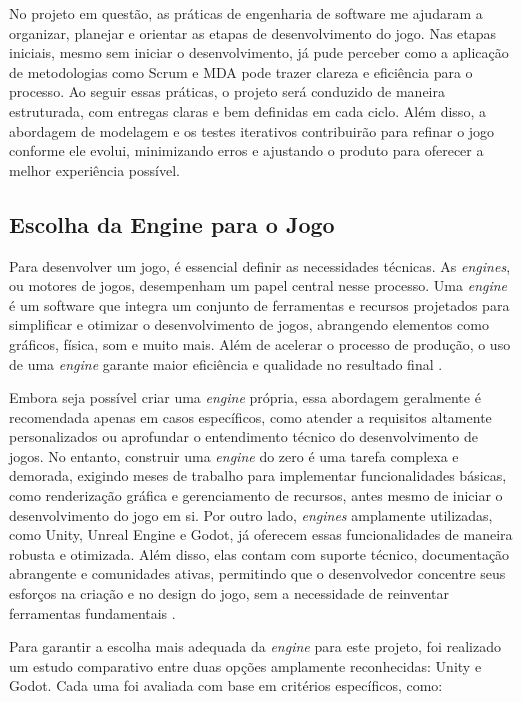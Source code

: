 No projeto em questão, as práticas de engenharia de software me ajudaram a organizar, planejar e orientar as etapas de desenvolvimento do jogo. Nas etapas iniciais, mesmo sem iniciar o desenvolvimento, já pude perceber como a aplicação de metodologias como Scrum e MDA pode trazer clareza e eficiência para o processo. Ao seguir essas práticas, o projeto será conduzido de maneira estruturada, com entregas claras e bem definidas em cada ciclo. Além disso, a abordagem de modelagem e os testes iterativos contribuirão para refinar o jogo conforme ele evolui, minimizando erros e ajustando o produto para oferecer a melhor experiência possível.

\subsection{Escolha da Engine para o Jogo}

Para desenvolver um jogo, é essencial definir as necessidades técnicas. As \textit{engines}, ou motores de jogos, desempenham um papel central nesse processo. Uma \textit{engine} é um software que integra um conjunto de ferramentas e recursos projetados para simplificar e otimizar o desenvolvimento de jogos, abrangendo elementos como gráficos, física, som e muito mais. Além de acelerar o processo de produção, o uso de uma \textit{engine} garante maior eficiência e qualidade no resultado final \cite{pixstudios}.

Embora seja possível criar uma \textit{engine} própria, essa abordagem geralmente é recomendada apenas em casos específicos, como atender a requisitos altamente personalizados ou aprofundar o entendimento técnico do desenvolvimento de jogos. No entanto, construir uma \textit{engine} do zero é uma tarefa complexa e demorada, exigindo meses de trabalho para implementar funcionalidades básicas, como renderização gráfica e gerenciamento de recursos, antes mesmo de iniciar o desenvolvimento do jogo em si. Por outro lado, \textit{engines} amplamente utilizadas, como Unity, Unreal Engine e Godot, já oferecem essas funcionalidades de maneira robusta e otimizada. Além disso, elas contam com suporte técnico, documentação abrangente e comunidades ativas, permitindo que o desenvolvedor concentre seus esforços na criação e no design do jogo, sem a necessidade de reinventar ferramentas fundamentais \cite{ullmann2022}.

Para garantir a escolha mais adequada da \textit{engine} para este projeto, foi realizado um estudo comparativo entre duas opções amplamente reconhecidas: Unity e Godot. Cada uma foi avaliada com base em critérios específicos, como:

